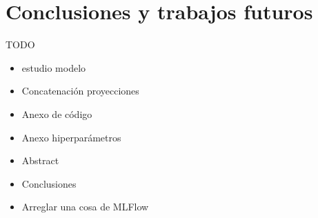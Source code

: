 \documentclass[a4paper,12pt,twoside,titlepage]{article}
\begin{document}


\section{Conclusiones y trabajos futuros}

TODO
\begin{itemize}
  \item estudio modelo
  \item Concatenación proyecciones
  \item Anexo de código
  \item Anexo hiperparámetros
  \item Abstract
  \item Conclusiones
  \item Arreglar una cosa de MLFlow
\end{itemize}

\newpage

\printbibliography[title={Bibliografía}]
\end{document}
